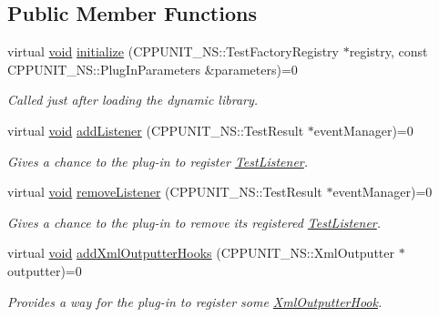 \subsection*{Public Member Functions}
\begin{DoxyCompactItemize}
\item 
virtual \hyperlink{wglew_8h_aeea6e3dfae3acf232096f57d2d57f084}{void} \hyperlink{struct_cpp_unit_test_plug_in_aec670330e7fced26c2a66b1dcd56edc0}{initialize} (C\-P\-P\-U\-N\-I\-T\-\_\-\-N\-S\-::\-Test\-Factory\-Registry $\ast$registry, const C\-P\-P\-U\-N\-I\-T\-\_\-\-N\-S\-::\-Plug\-In\-Parameters \&parameters)=0
\begin{DoxyCompactList}\small\item\em Called just after loading the dynamic library. \end{DoxyCompactList}\item 
virtual \hyperlink{wglew_8h_aeea6e3dfae3acf232096f57d2d57f084}{void} \hyperlink{struct_cpp_unit_test_plug_in_aad8038dc72d0f9798379937fe5692c97}{add\-Listener} (C\-P\-P\-U\-N\-I\-T\-\_\-\-N\-S\-::\-Test\-Result $\ast$event\-Manager)=0
\begin{DoxyCompactList}\small\item\em Gives a chance to the plug-\/in to register \hyperlink{class_test_listener}{Test\-Listener}. \end{DoxyCompactList}\item 
virtual \hyperlink{wglew_8h_aeea6e3dfae3acf232096f57d2d57f084}{void} \hyperlink{struct_cpp_unit_test_plug_in_a8f36157014b515d38efbc8ab67923d85}{remove\-Listener} (C\-P\-P\-U\-N\-I\-T\-\_\-\-N\-S\-::\-Test\-Result $\ast$event\-Manager)=0
\begin{DoxyCompactList}\small\item\em Gives a chance to the plug-\/in to remove its registered \hyperlink{class_test_listener}{Test\-Listener}. \end{DoxyCompactList}\item 
virtual \hyperlink{wglew_8h_aeea6e3dfae3acf232096f57d2d57f084}{void} \hyperlink{struct_cpp_unit_test_plug_in_a547cfddd0513dc9182721f723e27d9e3}{add\-Xml\-Outputter\-Hooks} (C\-P\-P\-U\-N\-I\-T\-\_\-\-N\-S\-::\-Xml\-Outputter $\ast$outputter)=0
\begin{DoxyCompactList}\small\item\em Provides a way for the plug-\/in to register some \hyperlink{class_xml_outputter_hook}{Xml\-Outputter\-Hook}. \end{DoxyCompactList}\item 

\end{DoxyCompactItemize}
